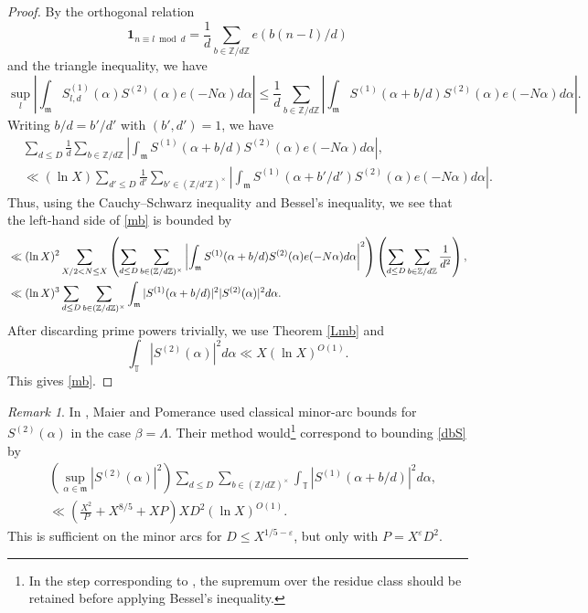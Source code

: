 \documentclass{amsart}
\theoremstyle{definition}
\theoremstyle{remark}
\newtheorem{rem}[dfn]{Remark}
\newcommand{\1}{
    \bm{1}
}
\newcommand{\pZ}[1]{
(\mathbb{Z}/{ #1 \mathbb{Z}})^{\times}
}
\newcommand{\aZ}[1]{
\mathbb{Z}/{ #1 \mathbb{Z}}
}
\begin{document}
\begin{proof}
By the orthogonal relation
\[ \1_{n \equiv l \bmod d} = \frac{1}{d} \sum_{b \in \aZ{d}} e(b(n-l)/d) \]
and the triangle inequality, we have
\[ \sup_{l} \left| \int_{\mathfrak{m}} S^{(1)}_{l,d}(\alpha) S^{(2)}(\alpha) e(-N\alpha) d\alpha \right| \leq \frac{1}{d} \sum_{b \in \aZ{d}}  \left| \int_{\mathfrak{m}} S^{(1)}(\alpha+b/d) S^{(2)}(\alpha) e(-N\alpha) d\alpha \right|. \]
Writing $b/d=b'/d'$ with $(b',d')=1$, we have
\begin{align*}
& \sum_{d \leq D} \frac{1}{d} \sum_{b \in \aZ{d}}  \left| \int_{\mathfrak{m}} S^{(1)}(\alpha+b/d) S^{(2)}(\alpha) e(-N\alpha) d\alpha \right|, \\
&\ll (\ln{X}) \sum_{d' \leq D} \frac{1}{d'} \sum_{b' \in \pZ{d'}} \left| \int_{\mathfrak{m}} S^{(1)}(\alpha+b'/d') S^{(2)}(\alpha) e(-N\alpha) d\alpha \right|. 
\end{align*}
Thus, using the Cauchy--Schwarz inequality and Bessel's inequality, we see that the left-hand side of \eqref{mb} is bounded by 
\begin{align}
&\ll (\ln{X})^2 \sum_{X/2 < N \leq X} \left( \sum_{d \leq D} \sum_{b \in \pZ{d}} \left| \int_{\mathfrak{m}} S^{(1)}(\alpha+b/d)S^{(2)}(\alpha) e(-N\alpha) d\alpha \right|^2 \right) \left( \sum_{d \leq D} \sum_{b \in \aZ{d}} \frac{1}{d^2} \right), \notag \\
&\ll (\ln{X})^3 \sum_{d \leq D} \sum_{b \in \pZ{d}} \int_{\mathfrak{m}} |S^{(1)}(\alpha+b/d)|^2 |S^{(2)}(\alpha)|^2 d\alpha. \label{dbS}
\end{align}
After discarding prime powers trivially, we use Theorem \ref{Lmb} and 
\[ \int_{\mathbb{T}}  |S^{(2)}(\alpha)|^2 d\alpha \ll X(\ln{X})^{O(1)}. \]
This gives \eqref{mb}. 

\end{proof}






\begin{rem}
In \cite{maier1990unusually}, Maier and Pomerance used classical minor-arc bounds for $S^{(2)}(\alpha)$ in the case $\beta=\Lambda$. Their method would\footnote{In the step corresponding to \cite[(6.6)]{maier1990unusually}, the supremum over the residue class should be retained before applying Bessel's inequality.} correspond to bounding \eqref{dbS} by
\begin{align*}
& \left( \sup_{\alpha \in \mathfrak{m}} |S^{(2)}(\alpha)|^2 \right) \sum_{d \leq D} \sum_{b \in \pZ{d}} \int_{\mathbb{T}} |S^{(1)}(\alpha+b/d)|^2 d\alpha, \\
&\ll \left( \frac{X^2}{P} + X^{8/5} + XP \right) X D^2 (\ln{X})^{O(1)}. 
\end{align*}
This is sufficient on the minor arcs for $D \leq X^{1/5-\varepsilon}$, but only with $P=X^{\varepsilon}D^2$.
\end{rem}
\end{document}
